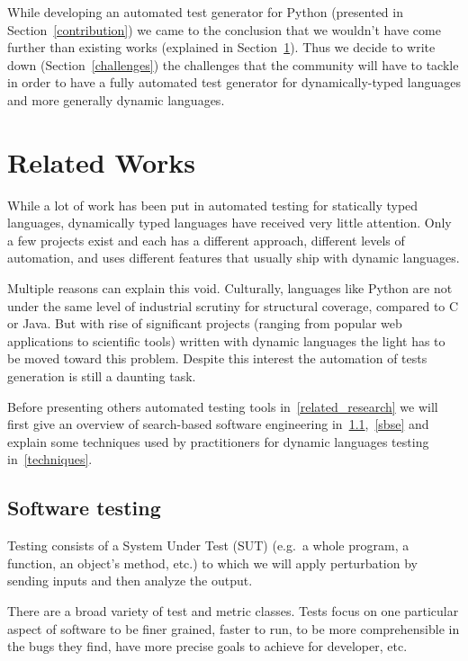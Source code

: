 \documentclass{llncs2e/llncs}
\begin{document}
While developing an automated test generator for Python (presented in
Section~\ref{contribution}) we came to the conclusion that we wouldn't have come
further than existing works (explained in Section~\ref{relatedwork}). Thus we
decide to write down (Section~\ref{challenges}) the challenges that the
community will have to tackle in order to have a fully automated test generator
for dynamically-typed languages and more generally dynamic languages.


\section{Related Works}
\label{relatedwork}

While a lot of work has been put in automated testing for statically typed
languages, dynamically typed languages have received very little attention. Only
a few projects exist and each has a different approach, different levels of
automation, and uses different features that usually ship with dynamic
languages.

Multiple reasons can explain this void. Culturally, languages like Python are
not under the same level of industrial scrutiny for structural coverage,
compared to C or Java. But with rise of significant projects (ranging from
popular web applications to scientific tools) written with dynamic languages the
light has to be moved toward this problem.  Despite this interest the automation
of tests generation is still a daunting task.

Before presenting others automated testing tools in~\ref{related_research} we
will first give an overview of search-based software engineering in~\ref{st},~\ref{sbse}
and explain some techniques used by practitioners for dynamic languages testing
in~\ref{techniques}.

\subsection{Software testing}
\label{st}

Testing consists of a System Under Test (SUT) (e.g.\ a whole program, a
function, an object's method, etc.) to which we will apply perturbation by
sending inputs and then analyze the output.

There are a broad variety of test and metric classes. Tests focus on one
particular aspect of software to be finer grained, faster to run, to be more
comprehensible in the bugs they find, have more precise goals to achieve for
developer, etc.
\end{document}
